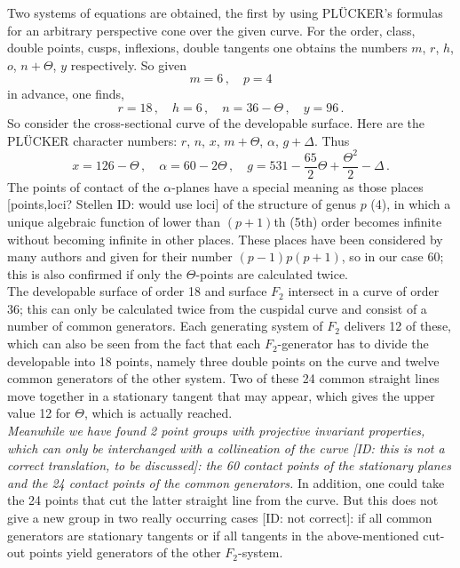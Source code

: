 \documentclass[leqno]{article}
\begin{document}
Two systems of equations are obtained, the first by using PL\"UCKER's formulas for an arbitrary perspective cone over the given curve. For the order, class, double points, cusps, inflexions, double tangents one obtains the numbers $ m $, $ r $, $ h $, $ o $, $ n + \Theta $, $ y $ respectively. So given
\[
m=6 \, , \quad p=4
\]
in advance, one finds,
\[
r = 18 \, , \quad h = 6 \, , \quad n = 36-\Theta \, , \quad y = 96 \, .
\]
So consider the cross-sectional curve of the developable surface. Here are the PL\"UCKER character numbers: $r$, $n$, $x$, $m+\Theta$, $\alpha$, $g+\Delta$. Thus 
\[
x = 126-\Theta \, , \quad \alpha=60-2\Theta \, , \quad g = 531-\frac{65}{2}\Theta + \frac{\Theta^2}{2} - \Delta \, . 
\]
The points of contact of the $ \alpha$-planes have a special meaning as those places [points,loci? Stellen ID: would use loci] of the structure of genus $p$ (4), in which a unique algebraic function of lower than $(p + 1)$th (5th) order becomes infinite without becoming infinite in other places. These places have been considered by many authors and given for their number $ (p-1) p (p + 1) $, so in our case 60; this is also confirmed if only the $ \Theta$-points are calculated twice. \\
The developable surface of order 18 and surface $ F_2 $ intersect in a curve of order 36; this can only be calculated twice from the cuspidal curve and consist of a number of common generators. Each generating system of $ F_2 $ delivers 12 of these, which can also be seen from the fact that each $ F_2$-generator has to divide the developable into 18 points, namely three double points on the curve and twelve common generators of the other system. Two of these 24 common straight lines move together in a stationary tangent that may appear, which gives the upper value 12 for $ \Theta $, which is actually reached. \\
\textit{Meanwhile we have found 2 point groups with projective invariant properties, which can only be interchanged with a collineation of the curve [ID: this is not a correct translation, to be discussed]: the 60 contact points of the stationary planes and the 24 contact points of the common generators.} In addition, one could take the 24 points that cut the latter straight line from the curve. But this does not give a new group in two really occurring cases [ID: not correct]: if all common generators are stationary tangents or if all tangents in the above-mentioned cut-out points yield generators of the other $ F_2 $-system. \\
\end{document}
